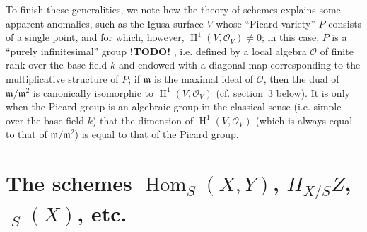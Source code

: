 \documentclass{article}
\theoremstyle{plain}
\theoremstyle{definition}
\newcommand{\sh}[1]{{\mathscr{#1}}}
\newcommand{\fk}[1]{{\mathfrak{#1}}}
\DeclareMathOperator{\Hom}{Hom}
\DeclareMathOperator{\Aut}{Aut}
\DeclareMathOperator{\shAut}{\underline{\Aut}}
\DeclareMathOperator{\HH}{H}
\newcommand{\todo}{\textbf{ !TODO! }}
\begin{document}
To finish these generalities, we note how the theory of schemes explains some apparent anomalies, such as the Igusa surface $V$ whose ``Picard variety'' $P$ consists of a single point, and for which, however, $\HH^1(V,\sh{O}_V)\neq0$;
in this case, $P$ is a ``purely infinitesimal'' group \todo, i.e. defined by a local algebra $\sh{O}$ of finite rank over the base field $k$ and endowed with a diagonal map corresponding to the multiplicative structure of $P$;
if $\fk{m}$ is the maximal ideal of $\sh{O}$, then the dual of $\fk{m}/\fk{m}^2$ is canonically isomorphic to $\HH^1(V,\sh{O}_V)$ (cf. section~\hyperref[C.3]{3} below).
It is only when the Picard group is an algebraic group in the classical sense (i.e. simple over the base field $k$) that the dimension of $\HH^1(V,\sh{O}_V)$ (which is always equal to that of $\fk{m}/\fk{m}^2$) is equal to that of the Picard group.


\section{The schemes \texorpdfstring{$\Hom_S(X,Y)$}{HomS(X,Y)}, \texorpdfstring{$\Pi_{X/S}Z$}{Pi X/S Z}, \texorpdfstring{$\shAut_S(X)$}{AutS(X)}, etc.}
\label{C.2}
\end{document}
